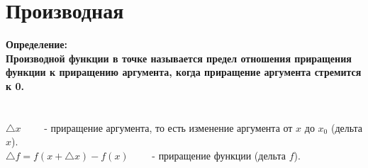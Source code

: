 \chapter{Производная}
\textbf{Определение:}\\
\textbf{Производной функции в точке называется предел отношения приращения функции к приращению аргумента, когда приращение аргумента стремится к 0.}\\
\textbf{}\\\\
$\triangle x \qquad$ - приращение аргумента, то есть изменение аргумента от $x$ до $x_0$ (дельта $x$).\\
$\triangle f = f(x + \triangle x) - f(x) \qquad$ - приращение функции (дельта $f$).\\






